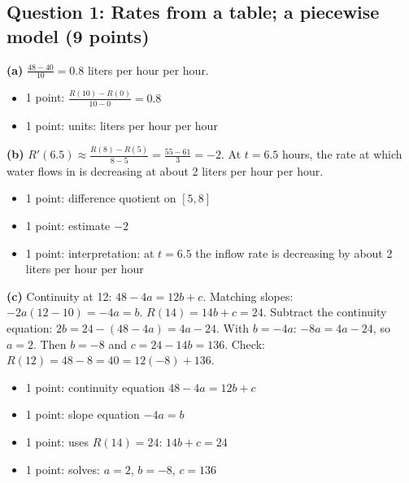 \documentclass{apcalc}
\begin{document}
\subsection*{Question 1: Rates from a table; a piecewise model (9 points)}
\textbf{(a)} $\frac{48-40}{10}=0.8$ liters per hour per hour.
\begin{itemize}[leftmargin=1.6em,itemsep=0pt]
\item 1 point: $\frac{R(10)-R(0)}{10-0}=0.8$
\item 1 point: units: liters per hour per hour
\end{itemize}
\textbf{(b)} $R'(6.5)\approx\frac{R(8)-R(5)}{8-5}=\frac{55-61}{3}=-2$. At $t=6.5$ hours, the rate at which water flows in is decreasing at about 2 liters per hour per hour.
\begin{itemize}[leftmargin=1.6em,itemsep=0pt]
\item 1 point: difference quotient on $[5,8]$
\item 1 point: estimate $-2$
\item 1 point: interpretation: at $t=6.5$ the inflow rate is decreasing by about 2 liters per hour per hour
\end{itemize}
\textbf{(c)} Continuity at 12: $48-4a=12b+c$. Matching slopes: $-2a(12-10)=-4a=b$. $R(14)=14b+c=24$. Subtract the continuity equation: $2b=24-(48-4a)=4a-24$. With $b=-4a$: $-8a=4a-24$, so $a=2$. Then $b=-8$ and $c=24-14b=136$. Check: $R(12)=48-8=40=12(-8)+136$.
\begin{itemize}[leftmargin=1.6em,itemsep=0pt]
\item 1 point: continuity equation $48-4a=12b+c$
\item 1 point: slope equation $-4a=b$
\item 1 point: uses $R(14)=24$: $14b+c=24$
\item 1 point: solves: $a=2$, $b=-8$, $c=136$
\end{itemize}
\end{document}
